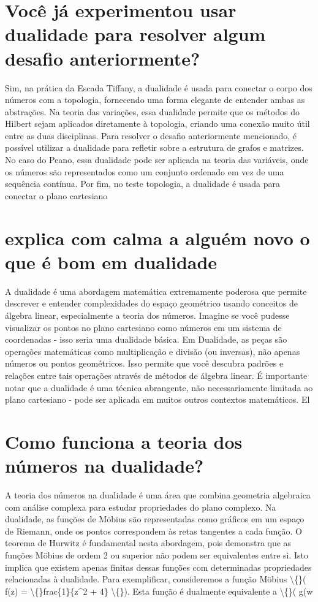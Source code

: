 \documentclass[11pt,a4paper]{article}
\begin{document}
\section{Você já experimentou usar dualidade para resolver algum desafio anteriormente?}
Sim, na prática da Escada Tiffany, a dualidade é usada para conectar o corpo dos números com a topologia, fornecendo uma forma elegante de entender ambas as abstrações. Na teoria das variações, essa dualidade permite que os métodos do Hilbert sejam aplicados diretamente à topologia, criando uma conexão muito útil entre as duas disciplinas. Para resolver o desafio anteriormente mencionado, é possível utilizar a dualidade para refletir sobre a estrutura de grafos e matrizes. No caso do Peano, essa dualidade pode ser aplicada na teoria das variáveis, onde os números são representados como um conjunto ordenado em vez de uma sequência contínua. Por fim, no teste topologia, a dualidade é usada para conectar o plano cartesiano

\section{explica com calma a alguém novo o que é bom em dualidade}
A dualidade é uma abordagem matemática extremamente poderosa que permite descrever e entender complexidades do espaço geométrico usando conceitos de álgebra linear, especialmente a teoria dos números. Imagine se você pudesse visualizar os pontos no plano cartesiano como números em um sistema de coordenadas - isso seria uma dualidade básica. Em Dualidade, as peças são operações matemáticas como multiplicação e divisão (ou inversas), não apenas números ou pontos geométricos. Isso permite que você descubra padrões e relações entre tais operações através de métodos de álgebra linear. É importante notar que a dualidade é uma técnica abrangente, não necessariamente limitada ao plano cartesiano - pode ser aplicada em muitos outros contextos matemáticos. El

\section{Como funciona a teoria dos números na dualidade?}
A teoria dos números na dualidade é uma área que combina geometria algebraica com análise complexa para estudar propriedades do plano complexo. Na dualidade, as funções de Möbius são representadas como gráficos em um espaço de Riemann, onde os pontos correspondem às retas tangentes a cada função. O teorema de Hurwitz é fundamental nesta abordagem, pois demonstra que as funções Möbius de ordem 2 ou superior não podem ser equivalentes entre si. Isto implica que existem apenas finitas dessas funções com determinadas propriedades relacionadas à dualidade. Para exemplificar, consideremos a função Möbius \textbackslash\{\}( f(z) = \textbackslash\{\}frac\{1\}\{z^2 + 4\} \textbackslash\{\}). Esta função é dualmente equivalente a \textbackslash\{\}( g(w
\end{document}

